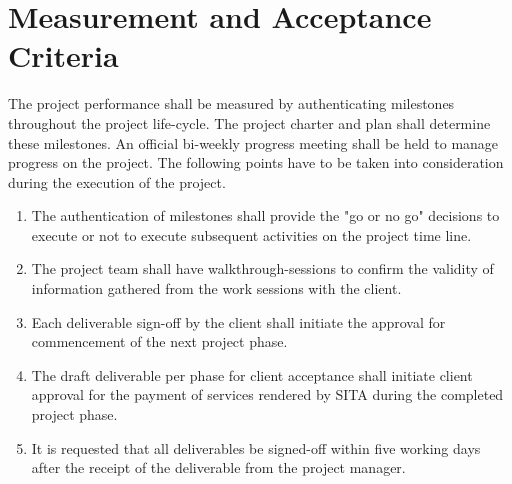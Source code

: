\section{Measurement and Acceptance Criteria}
The project performance shall be measured by authenticating milestones throughout the project life-cycle.  The project charter and plan shall determine these milestones.  An official bi-weekly progress meeting shall be held to manage progress on the project. The following points have to be taken into consideration during the execution of the project.
\begin{enumerate}
\item The authentication of milestones shall provide the "go or no go" decisions to execute or not to execute subsequent activities on the project time line. 
\item The project team shall have walkthrough-sessions to confirm the validity of information gathered from the work sessions with the client.
\item Each deliverable sign-off by the client shall initiate the approval for commencement of the next project phase.
\item The draft deliverable per phase for client acceptance shall initiate client approval for the payment of services rendered by SITA during the completed project phase. 
\item It is requested that all deliverables be signed-off within five working days after the receipt of the deliverable from the \clients project manager.
\end{enumerate}
